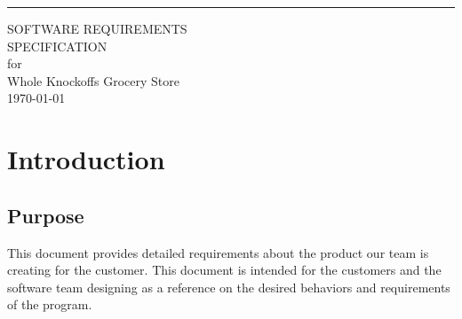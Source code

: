 \documentclass{scrreprt}
\date{}
\theoremstyle{funreq}
\def\myversion{1.0 }
\begin{document}
\begin{flushright}
    \rule{16cm}{5pt}\vskip1cm
    \begin{bfseries}
        \Huge{SOFTWARE REQUIREMENTS\\ SPECIFICATION}\\
        \vspace{1.9cm}
        for\\
        \vspace{1.9cm}
        Whole Knockoffs Grocery Store\\
        \vspace{1.9cm}
        \today\\
    \end{bfseries}
\end{flushright}

\tableofcontents


%

\chapter{Introduction}

\section{Purpose}
This document provides detailed requirements about the product our team is creating for the customer.  This document is intended for the customers and the software team designing as a reference on the desired behaviors and requirements of the program.
\end{document}

